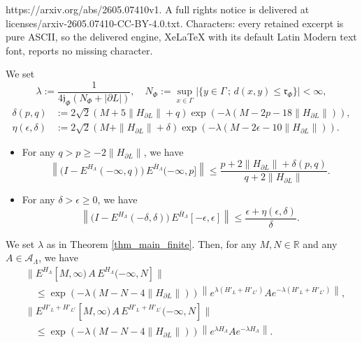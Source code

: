 \documentclass[10pt,a4paper]{amsart}
\begin{document}
https://arxiv.org/abs/2605.07410v1. A full rights notice is delivered at licenses/arxiv-2605.07410-CC-BY-4.0.txt. Characters: every retained excerpt is pure ASCII, so the delivered engine, XeLaTeX with its default Latin Modern text font, reports no missing character.
\begin{theorem}\label{thm_main_finite}
We set
\[
\lambda:=\frac{1}{4\mathfrak{j}_\Phi(N_\Phi+|\partial L|)},\quad N_\Phi:=\sup_{x\in\Gamma} |\{ y\in\Gamma \,;\, d(x,y)\leq \mathfrak{r}_\Phi\}|<\infty,
\]
\begin{align*}
\delta(p,q)&:=2\sqrt{2}(M+5\|H_{\partial L}\|+q) \exp(-\lambda(M-2p-18\|H_{\partial L}\|)),\\
\eta(\epsilon,\delta)&:=2\sqrt{2}(M+\|H_{\partial L}\|+\delta) \exp(-\lambda(M-2\epsilon-10\|H_{\partial L}\|)).
\end{align*}
\begin{itemize}
\item[(i)] For any $q>p\geq-2\|H_{\partial L}\|$, we have
\[
\left\|\Big(I-E^{H_\Lambda}(-\infty,q)\Big)\,
E^{\bar{H}_\Lambda}(-\infty,p]\right\|
\leq\frac{p+2\|H_{\partial L}\|+\delta(p,q)}{q+2\|H_{\partial L}\|}.
\]
\item[(ii)] For any $\delta>\epsilon\geq0$, we have
\[
\left\|\Big(I-E^{H_\Lambda}(-\delta,\delta)\Big)\,
E^{\bar{H}_\Lambda}[-\epsilon,\epsilon]\right\|
\leq\frac{\epsilon+\eta(\epsilon,\delta)}{\delta}.
\]
\end{itemize}
\end{theorem}

\begin{lemma}\label{lem_AKL2.1_5.1}
We set $\lambda$ as in Theorem \ref{thm_main_finite}. Then, for any $M,N\in\mathbb{R}$ and any $A\in\mathcal{A}_\Lambda$, we have
\begin{align*}
&\|E^{H_\Lambda}[M,\infty) \,A\, E^{H_\Lambda}(-\infty,N]\|\\
&\quad\leq \exp(-\lambda(M-N-4\|H_{\partial L}\|)) \left\|e^{\lambda(H'_L+H'_{L^c})}Ae^{-\lambda(H'_L+H'_{L^c})}\right\|,\\
&\|E^{H'_L+H'_{L^c}}[M,\infty) \,A\, E^{H'_L+H'_{L^c}}(-\infty,N]\|\\
&\quad\leq \exp(-\lambda(M-N-4\|H_{\partial L}\|)) \left\|e^{\lambda H_\Lambda}Ae^{-\lambda H_\Lambda}\right\|.
\end{align*}
\end{lemma}
\end{document}

